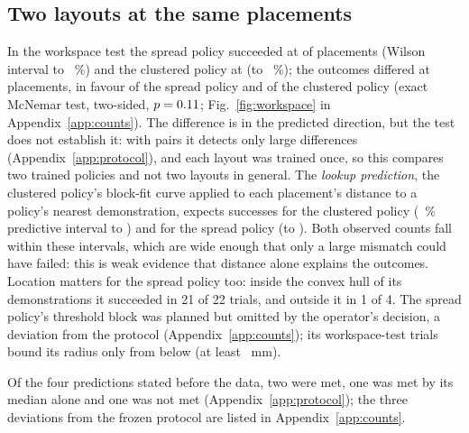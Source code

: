 \subsection{Two layouts at the same placements}
In the workspace test the spread policy succeeded at \workspaceSuccessSpread of \nPairs placements (Wilson interval \cite{wilson1927probable} \workspaceSpreadLow to \workspaceSpreadHigh~\%) and the clustered policy at \workspaceSuccessClustered (\workspaceClusteredLow to \workspaceClusteredHigh~\%); the outcomes differed at \pairsDiscordant placements, \pairsOnlySpread in favour of the spread policy and \pairsOnlyClustered of the clustered policy (exact McNemar test, two-sided, $p=0.11$; Fig.~\ref{fig:workspace} in Appendix~\ref{app:counts}).
The difference is in the predicted direction, but the test does not establish it: with \nPairs pairs it detects only large differences (Appendix~\ref{app:protocol}), and each layout was trained once, so this compares two trained policies and not two layouts in general.
The \emph{lookup prediction}, the clustered policy's block-fit curve applied to each placement's distance to a policy's nearest demonstration, expects \lookupPredictedClustered successes for the clustered policy (\intervalLevel~\% predictive interval \lookupClusteredLow to \lookupClusteredHigh) and \lookupPredictedSpread for the spread policy (\lookupSpreadLow to \lookupSpreadHigh). Both observed counts fall within these intervals, which are wide enough that only a large mismatch could have failed: this is weak evidence that distance alone explains the outcomes.
Location matters for the spread policy too: inside the convex hull of its demonstrations it succeeded in 21 of 22 trials, and outside it in 1 of 4. %
The spread policy's threshold block was planned but omitted by the operator's decision, a deviation from the protocol (Appendix~\ref{app:counts}); its workspace-test trials bound its radius only from below (at least \radiusSpreadLow~mm).

Of the four predictions stated before the data, two were met, one was met by its median alone and one was not met (Appendix~\ref{app:protocol}); the three deviations from the frozen protocol are listed in Appendix~\ref{app:counts}. %
